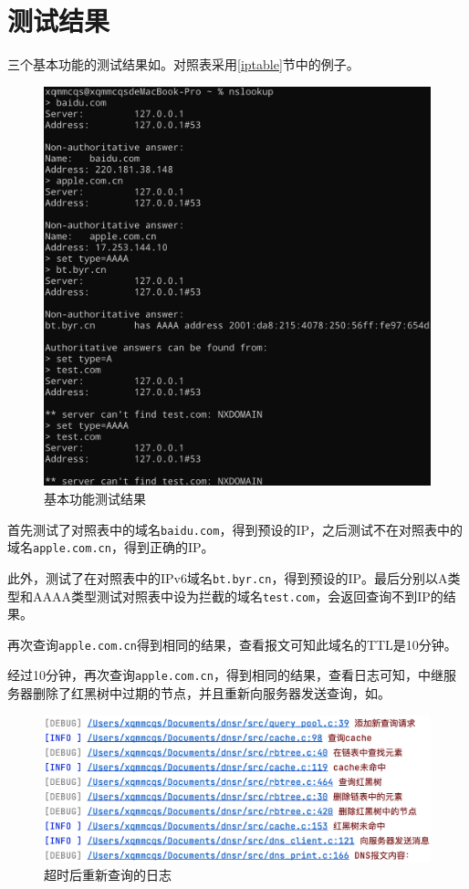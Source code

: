 \documentclass[lang=cn,11pt,a4paper,cite=authornum]{paper}
\begin{document}
\section{测试结果}

三个基本功能的测试结果如。对照表采用\ref{iptable}节中的例子。

\begin{figure}[htbp]

    \centering
    \includegraphics[width=0.7\linewidth]{./Images/test.png}
    \caption{基本功能测试结果\label{fig:test}}

\end{figure}

首先测试了对照表中的域名\texttt{baidu.com}，得到预设的IP，之后测试不在对照表中的域名\texttt{apple.com.cn}，得到正确的IP。

此外，测试了在对照表中的IPv6域名\texttt{bt.byr.cn}，得到预设的IP。最后分别以A类型和AAAA类型测试对照表中设为拦截的域名\texttt{test.com}，会返回查询不到IP的结果。

再次查询\texttt{apple.com.cn}得到相同的结果，查看报文可知此域名的TTL是10分钟。

经过10分钟，再次查询\texttt{apple.com.cn}，得到相同的结果，查看日志可知，中继服务器删除了红黑树中过期的节点，并且重新向服务器发送查询，如。

\begin{figure}[htbp]

    \centering
    \includegraphics[width=0.7\linewidth]{./Images/resend.png}
    \caption{超时后重新查询的日志\label{fig:resend}}

\end{figure}
\end{document}
